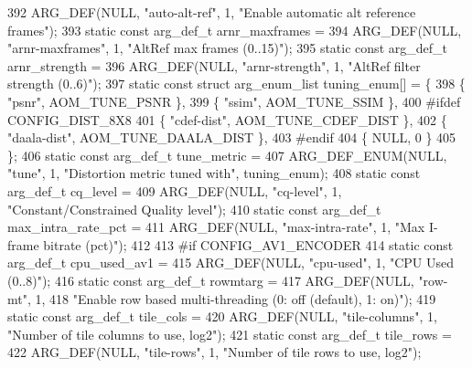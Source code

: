 \begin{DoxyCodeInclude}
{{{{{{{392     ARG\_DEF(NULL, \textcolor{stringliteral}{"auto-alt-ref"}, 1, \textcolor{stringliteral}{"Enable automatic alt reference frames"});
393 \textcolor{keyword}{static} \textcolor{keyword}{const} arg\_def\_t arnr\_maxframes =
394     ARG\_DEF(NULL, \textcolor{stringliteral}{"arnr-maxframes"}, 1, \textcolor{stringliteral}{"AltRef max frames (0..15)"});
395 \textcolor{keyword}{static} \textcolor{keyword}{const} arg\_def\_t arnr\_strength =
396     ARG\_DEF(NULL, \textcolor{stringliteral}{"arnr-strength"}, 1, \textcolor{stringliteral}{"AltRef filter strength (0..6)"});
397 \textcolor{keyword}{static} \textcolor{keyword}{const} \textcolor{keyword}{struct }arg\_enum\_list tuning\_enum[] = \{
398   \{ \textcolor{stringliteral}{"psnr"}, AOM\_TUNE\_PSNR \},
399   \{ \textcolor{stringliteral}{"ssim"}, AOM\_TUNE\_SSIM \},
400 \textcolor{preprocessor}{#ifdef CONFIG\_DIST\_8X8}
401   \{ \textcolor{stringliteral}{"cdef-dist"}, AOM\_TUNE\_CDEF\_DIST \},
402   \{ \textcolor{stringliteral}{"daala-dist"}, AOM\_TUNE\_DAALA\_DIST \},
403 \textcolor{preprocessor}{#endif}
404   \{ NULL, 0 \}
405 \};
406 \textcolor{keyword}{static} \textcolor{keyword}{const} arg\_def\_t tune\_metric =
407     ARG\_DEF\_ENUM(NULL, \textcolor{stringliteral}{"tune"}, 1, \textcolor{stringliteral}{"Distortion metric tuned with"}, tuning\_enum);
408 \textcolor{keyword}{static} \textcolor{keyword}{const} arg\_def\_t cq\_level =
409     ARG\_DEF(NULL, \textcolor{stringliteral}{"cq-level"}, 1, \textcolor{stringliteral}{"Constant/Constrained Quality level"});
410 \textcolor{keyword}{static} \textcolor{keyword}{const} arg\_def\_t max\_intra\_rate\_pct =
411     ARG\_DEF(NULL, \textcolor{stringliteral}{"max-intra-rate"}, 1, \textcolor{stringliteral}{"Max I-frame bitrate (pct)"});
412 
413 \textcolor{preprocessor}{#if CONFIG\_AV1\_ENCODER}
414 \textcolor{keyword}{static} \textcolor{keyword}{const} arg\_def\_t cpu\_used\_av1 =
415     ARG\_DEF(NULL, \textcolor{stringliteral}{"cpu-used"}, 1, \textcolor{stringliteral}{"CPU Used (0..8)"});
416 \textcolor{keyword}{static} \textcolor{keyword}{const} arg\_def\_t rowmtarg =
417     ARG\_DEF(NULL, \textcolor{stringliteral}{"row-mt"}, 1,
418             \textcolor{stringliteral}{"Enable row based multi-threading (0: off (default), 1: on)"});
419 \textcolor{keyword}{static} \textcolor{keyword}{const} arg\_def\_t tile\_cols =
420     ARG\_DEF(NULL, \textcolor{stringliteral}{"tile-columns"}, 1, \textcolor{stringliteral}{"Number of tile columns to use, log2"});
421 \textcolor{keyword}{static} \textcolor{keyword}{const} arg\_def\_t tile\_rows =
422     ARG\_DEF(NULL, \textcolor{stringliteral}{"tile-rows"}, 1, \textcolor{stringliteral}{"Number of tile rows to use, log2"});
}}}}}}}
\end{DoxyCodeInclude}
